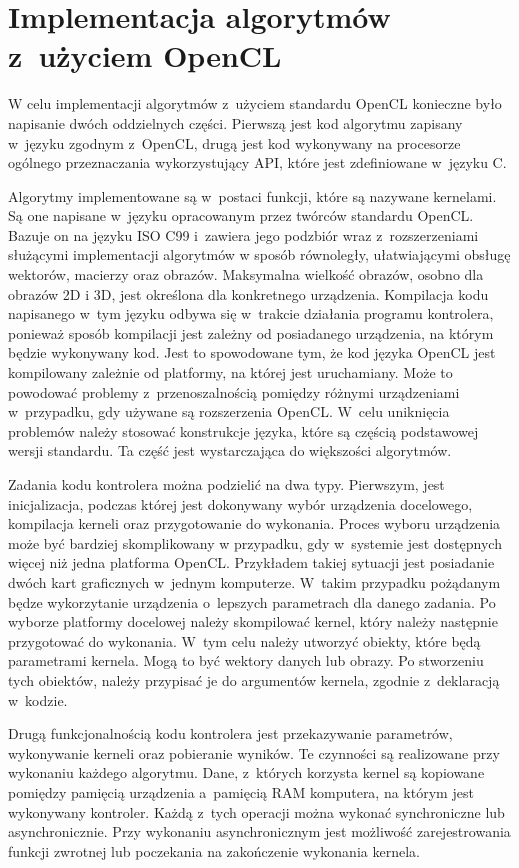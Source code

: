 \section{Implementacja algorytmów z~użyciem OpenCL}  
\label{sec:szczegolyOpenCL}

W celu implementacji algorytmów z~użyciem standardu OpenCL konieczne było napisanie dwóch oddzielnych części. Pierwszą jest kod algorytmu zapisany w~języku zgodnym z~OpenCL, drugą jest kod wykonywany na procesorze ogólnego przeznaczania wykorzystujący API, które jest zdefiniowane w~języku C.

Algorytmy implementowane są w~postaci funkcji, które są nazywane kernelami. Są one napisane w~języku opracowanym przez twórców standardu OpenCL. Bazuje on na języku ISO C99 i~zawiera jego podzbiór wraz z~rozszerzeniami służącymi implementacji algorytmów w sposób równoległy, ułatwiającymi obsługę wektorów, macierzy oraz obrazów. Maksymalna wielkość obrazów, osobno dla obrazów 2D i 3D, jest określona dla konkretnego urządzenia. Kompilacja kodu napisanego w~tym języku odbywa się w~trakcie działania programu kontrolera, ponieważ sposób kompilacji jest zależny od posiadanego urządzenia, na którym będzie wykonywany kod. Jest to spowodowane tym, że kod języka OpenCL jest kompilowany zależnie od platformy, na której jest uruchamiany. Może to powodować problemy z~przenoszalnością pomiędzy różnymi urządzeniami w~przypadku, gdy używane są rozszerzenia OpenCL. W~celu uniknięcia problemów należy stosować konstrukcje języka, które są częścią podstawowej wersji standardu. Ta część jest wystarczająca do większości algorytmów.

Zadania kodu kontrolera można podzielić na dwa typy. Pierwszym, jest inicjalizacja, podczas której jest dokonywany wybór urządzenia docelowego, kompilacja kerneli oraz przygotowanie do wykonania. Proces wyboru urządzenia może być bardziej skomplikowany w przypadku, gdy w~systemie jest dostępnych więcej niż jedna platforma OpenCL. Przykładem takiej sytuacji jest posiadanie dwóch kart graficznych w~jednym komputerze. W~takim przypadku pożądanym będze wykorzytanie urządzenia o~lepszych parametrach dla danego zadania. Po wyborze platformy docelowej należy skompilować kernel, który należy następnie przygotować do wykonania. W~tym celu należy utworzyć obiekty, które będą parametrami kernela. Mogą to być wektory danych lub obrazy. Po stworzeniu tych obiektów, należy przypisać je do argumentów kernela, zgodnie z~deklaracją w~kodzie.

Drugą funkcjonalnością kodu kontrolera jest przekazywanie parametrów, wykonywanie kerneli oraz pobieranie wyników. Te czynności są realizowane przy wykonaniu każdego algorytmu. Dane, z~których korzysta kernel są kopiowane pomiędzy pamięcią urządzenia a~pamięcią RAM komputera, na którym jest wykonywany kontroler. Każdą z~tych operacji można wykonać synchroniczne lub asynchronicznie. Przy wykonaniu asynchronicznym jest możliwość zarejestrowania funkcji zwrotnej lub poczekania na zakończenie wykonania kernela.

